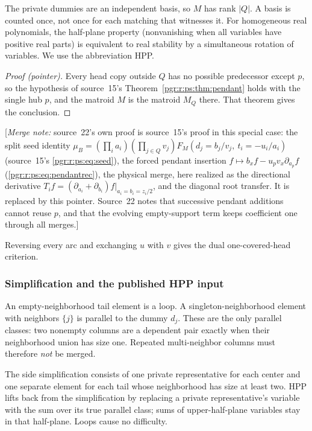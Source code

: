 \documentclass[11pt]{article}
\numberwithin{equation}{section}
\theoremstyle{definition}\newtheorem{definition}[theorem]{Definition}\newtheorem{remark}[theorem]{Remark}
\newcommand{\mnote}[1]{[\textit{Merge note:} #1]}
\begin{document}
The private dummies are an independent basis, so $M$ has rank $|Q|$. A basis is counted once, not once for each matching that witnesses it. For homogeneous real polynomials, the half-plane property (nonvanishing when all variables have positive real parts) is equivalent to real stability by a simultaneous rotation of variables. We use the abbreviation HPP.


\begin{proof}[Proof (pointer)]
Every head copy outside $Q$ has no possible predecessor except $p$, so the
hypothesis of source~15's Theorem~\ref{pgr:r:ps:thm:pendant} holds with
the single hub $p$, and the matroid $M$ is the matroid $M_Q$ there. That
theorem gives the conclusion.
\end{proof}
\mnote{source~22's own proof is source~15's proof in this special case:
the split seed identity $\mu_B=(\prod_ia_i)(\prod_{j\in Q}v_j)
F_M(d_j=b_j/v_j,\ t_i=-u_i/a_i)$ (source~15's
\eqref{pgr:r:ps:eq:seed}), the forced pendant insertion
$f\mapsto b_xf-u_pv_x\partial_{a_p}f$ (\eqref{pgr:r:ps:eq:pendantrec}),
the physical merge, here realized as the directional derivative
$T_if=(\partial_{a_i}+\partial_{b_i})f|_{a_i=b_i=z_i/2}$, and the diagonal
root transfer. It is replaced by this pointer. Source~22 notes that
successive pendant additions cannot reuse $p$, and that the evolving
empty-support term keeps coefficient one through all merges.}

Reversing every arc and exchanging $u$ with $v$ gives the dual one-covered-head criterion.

\subsubsection{Simplification and the published HPP input}
An empty-neighborhood tail element is a loop. A singleton-neighborhood element with neighbors $\{j\}$ is parallel to the dummy $d_j$. These are the only parallel classes: two nonempty columns are a dependent pair exactly when their neighborhood union has size one. Repeated multi-neighbor columns must therefore \emph{not} be merged.

The side simplification consists of one private representative for each center and one separate element for each tail whose neighborhood has size at least two. HPP lifts back from the simplification by replacing a private representative's variable with the sum over its true parallel class; sums of upper-half-plane variables stay in that half-plane. Loops cause no difficulty.
\end{document}
